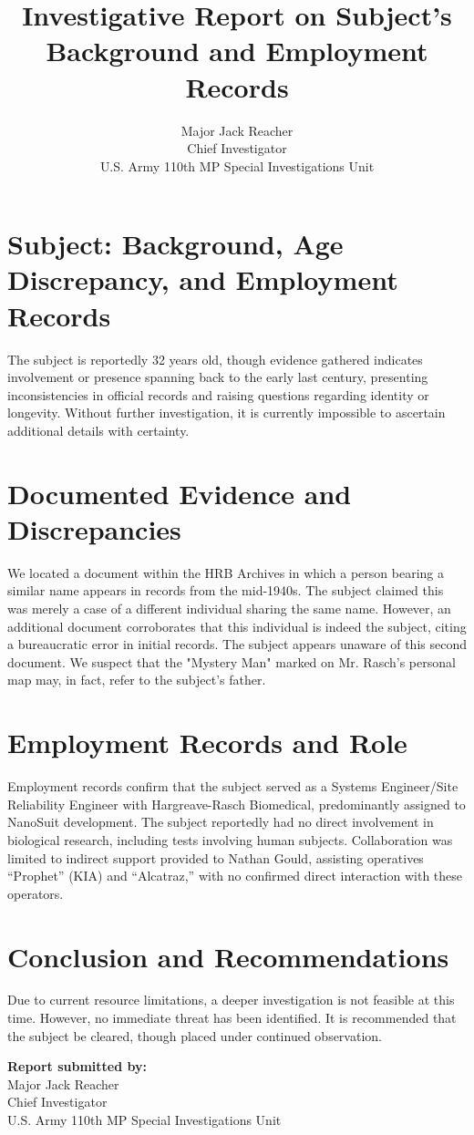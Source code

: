 \documentclass{article}
\title{\textbf{Investigative Report on Subject's Background and Employment Records}}
\author{Major Jack Reacher \\ Chief Investigator \\ U.S. Army 110th MP Special Investigations Unit}
\date{}
\begin{document}
\pagestyle{empty}

\maketitle

\section*{Subject: Background, Age Discrepancy, and Employment Records}

The subject is reportedly 32 years old, though evidence gathered indicates involvement or presence spanning back to the early last century, presenting inconsistencies in official records and raising questions regarding identity or longevity. Without further investigation, it is currently impossible to ascertain additional details with certainty.

\section*{Documented Evidence and Discrepancies}

We located a document within the HRB Archives in which a person bearing a similar name appears in records from the mid-1940s. The subject claimed this was merely a case of a different individual sharing the same name. However, an additional document corroborates that this individual is indeed the subject, citing a bureaucratic error in initial records. The subject appears unaware of this second document. We suspect that the "Mystery Man" marked on Mr. Rasch’s personal map may, in fact, refer to the subject's father.

\section*{Employment Records and Role}

Employment records confirm that the subject served as a Systems Engineer/Site Reliability Engineer with Hargreave-Rasch Biomedical, predominantly assigned to NanoSuit development. The subject reportedly had no direct involvement in biological research, including tests involving human subjects. Collaboration was limited to indirect support provided to Nathan Gould, assisting operatives “Prophet” (KIA) and “Alcatraz,” with no confirmed direct interaction with these operators.

\section*{Conclusion and Recommendations}

Due to current resource limitations, a deeper investigation is not feasible at this time. However, no immediate threat has been identified. It is recommended that the subject be cleared, though placed under continued observation.

\vspace{1cm}
\noindent
\textbf{Report submitted by:} \\
Major Jack Reacher \\
Chief Investigator \\
U.S. Army 110th MP Special Investigations Unit
\end{document}
